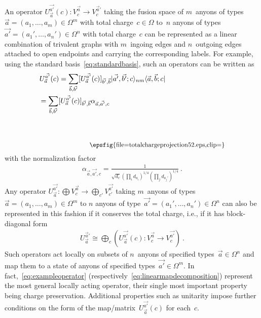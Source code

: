 \documentclass[floats,prb,twocolumn]{revtex4}
\newcommand{\ket}[1]{|#1\rangle}
\newcommand{\bra}[1]{\langle#1|}
\newcommand*{\totalchargeprojection}{\raisebox{-68.643pt}{\epsfig{file=totalchargeprojection52.eps,clip=}}}
\begin{document}
An operator $U_{\vec{a}}^{\vec{a'}}(c):V^{\vec{a}}_c\rightarrow  V^{\vec{a}'}_{c}$ taking the  fusion space of $m$~anyons of types  $\vec{a}=(a_1,\ldots,a_m)\in \Omega^m$ with  total charge~$c\in\Omega$ to~$n$ anyons of types~$\vec{a'}=(a_1',\ldots,a_n')\in \Omega^n$ with total charge~$c$ can be represented as a  linear combination of trivalent graphs with $m$~ingoing edges and $n$~outgoing edges attached to open endpoints and carrying the corresponding labels. For example, using the  standard basis~\eqref{eq:standardbasis},
such an operators can be written as
\begin{align}
U^{\vec{a'}}_{\vec{a}}(c)&=\sum_{\vec{b},\vec{b'}}[U^{\vec{a'}}_{\vec{a}}(c)]_{\vec{b'},\vec{b}}\ket{\vec{a'},\vec{b'};c}_{nm}\bra{\vec{a},\vec{b};c}\\
&\hspace{-1cm}=\sum_{\vec{b},\vec{b'}}[U^{\vec{a'}}_{\vec{a}}(c)]_{\vec{b'},\vec{b}}\alpha_{\vec{a},\vec{a'},c}\hspace{-1cm}\scalebox{0.9}{\totalchargeprojection}\label{eq:exampleoperator}
\end{align}
with the normalization factor 
\begin{align*}
\alpha_{\vec{a},\vec{a'},c}=\frac{1}{\sqrt{d_c}(\prod_i d_{a_i})^{1/4}(\prod_j d_{a_j'})^{1/4}}\ .
\end{align*}
Any operator $U^{\vec{a'}}_{\vec{a}}:\bigoplus V^{\vec{a}}_c\rightarrow \bigoplus_{c'} V^{\vec{a'}}_{c'}$ taking $m$~anyons of types $\vec{a}=(a_1,\ldots,a_m)\in\Omega^m$ to $n$ anyons of type~$\vec{a'}=(a_1',\ldots,a_n')\in \Omega^{n}$  can also be represented in this fashion if it conserves the total charge, i.e., if it has block-diagonal form
\begin{align}
U^{\vec{a}'}_{\vec{a}}\cong \bigoplus_c \left(U^{\vec{a'}}_{\vec{a}}(c):V^{\vec{a}}_c\rightarrow V^{\vec{a'}}_c\right)\ .\label{eq:linearmapdecomposition}
\end{align}
Such operators act locally on subsets of $n$~anyons of specified types~$\vec{a}\in\Omega^n$ and map them to a state of anyons of specified types~$\vec{a'}\in\Omega^m$.  In fact,~\eqref{eq:exampleoperator} (respectively~\eqref{eq:linearmapdecomposition}) represent the most general locally acting operator, their single most important property being charge preservation. Additional properties such as unitarity impose further conditions on the form of the map/matrix~$U^{\vec{a'}}_{\vec{a}}(c)$ for each~$c$.
\end{document}
